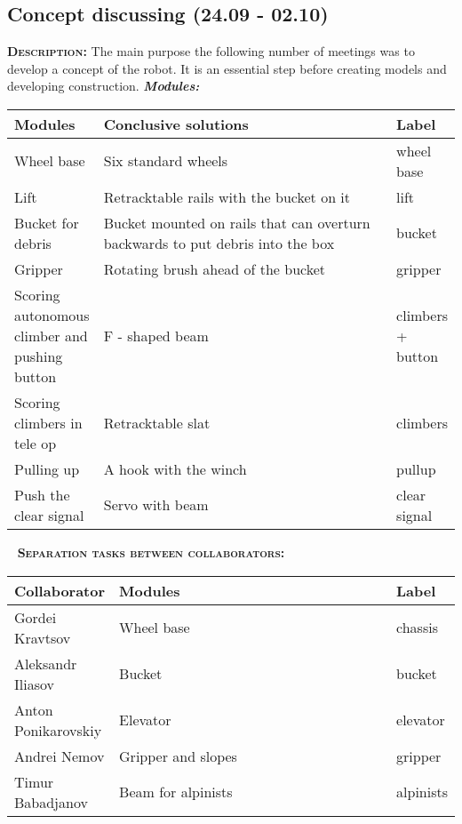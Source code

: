 \subsection{Concept discussing (24.09 - 02.10)}
	\textsc{\textbf{Description:}} The main purpose the following number of meetings was to develop a concept of the robot. It is an essential step before creating models and developing construction.\newline \newline
	\textit{\textbf{Modules:}}
	
	\begin{table}[H]
		\vspace{-2mm}
		\begin{center}
			\begin{tabular}{|p{0.2\linewidth}|p{0.7\linewidth}|p{0.1\linewidth}|}
				\hline
				Modules & Conclusive solutions & Label \\
				\hline
				Wheel base & Six standard wheels & wheel base \\
				\hline
				Lift & Retracktable rails with the bucket on it & lift \\
				\hline
				Bucket for debris & Bucket mounted on rails that can overturn backwards to put debris into the box & bucket \\
				\hline
				Gripper & Rotating brush ahead of the bucket & gripper\\
				\hline
				Scoring autonomous climber and pushing button & F - shaped beam & climbers + button\\
				\hline
				Scoring climbers in tele op & Retracktable slat & climbers\\
				\hline
				Pulling up & A hook with the winch & pullup\\
				\hline
				Push the clear signal & Servo with beam & clear signal\\
				\hline
			\end{tabular}
		\end{center}
	\end{table}
	\vspace{-10mm}
	 \newline
	\textsc{\textbf{Separation tasks between collaborators:}}
	
	\begin{table}[H]
		\vspace{-2mm}
		\begin{center}
			\begin{tabular}{|p{0.2\linewidth}|p{0.7\linewidth}|p{0.1\linewidth}|}
				\hline
				Collaborator & Modules & Label \\
				\hline
				Gordei Kravtsov & Wheel base & chassis \\
				\hline
				Aleksandr Iliasov & Bucket & bucket \\
				\hline
				Anton Ponikarovskiy & Elevator & elevator \\
				\hline
				Andrei Nemov & Gripper and slopes & gripper \\
				\hline
				Timur Babadjanov & Beam for alpinists & alpinists \\
				\hline
			\end{tabular}
		\end{center}
	\end{table}
  
